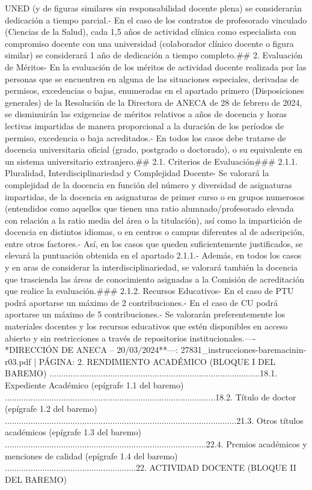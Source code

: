 \documentclass{article}
\begin{document}
\begin{itemize}
{{UNED (y de figuras similares sin responsabilidad docente plena) se considerarán dedicación a tiempo parcial.\n- En el caso de los contratos de profesorado vinculado (Ciencias de la Salud), cada 1,5 años de actividad clínica como especialista con compromiso docente con una universidad (colaborador clínico docente o figura similar) se considerará 1 año de dedicación a tiempo completo.\n\n## 2. Evaluación de Méritos\n\n- En la evaluación de los méritos de actividad docente realizada por las personas que se encuentren en alguna de las situaciones especiales, derivadas de permisos, excedencias o bajas, enumeradas en el apartado primero (Disposiciones generales) de la Resolución de la Directora de ANECA de 28 de febrero de 2024, se disminuirán las exigencias de méritos relativos a años de docencia y horas lectivas impartidas de manera proporcional a la duración de los períodos de permiso, excedencia o baja acreditados.\n- En todos los casos debe tratarse de docencia universitaria oficial (grado, postgrado o doctorado), o su equivalente en un sistema universitario extranjero.\n\n## 2.1. Criterios de Evaluación\n\n### 2.1.1. Pluralidad, Interdisciplinariedad y Complejidad Docente\n\n- Se valorará la complejidad de la docencia en función del número y diversidad de asignaturas impartidas, de la docencia en asignaturas de primer curso o en grupos numerosos (entendidos como aquellos que tienen una ratio alumnado/profesorado elevada con relación a la ratio media del área o la titulación), así como la impartición de docencia en distintos idiomas, o en centros o campus diferentes al de adscripción, entre otros factores.\n- Así, en los casos que queden suficientemente justificados, se elevará la puntuación obtenida en el apartado 2.1.1.\n- Además, en todos los casos y en aras de considerar la interdisciplinariedad, se valorará también la docencia que trascienda las áreas de conocimiento asignadas a la Comisión de acreditación que realice la evaluación.\n\n### 2.1.2. Recursos Educativos\n\n- En el caso de PTU podrá aportarse un máximo de 2 contribuciones.\n- En el caso de CU podrá aportarse un máximo de 5 contribuciones.\n- Se valorarán preferentemente los materiales docentes y los recursos educativos que estén disponibles en acceso abierto y sin restricciones a través de repositorios institucionales.\n\n----\n\n**DIRECCIÓN DE ANECA – 20/03/2024**\n\n---\n\nFUENTE: 27831_instrucciones-baremacinin-r03.pdf | PÁGINA: 2. RENDIMIENTO ACADÉMICO (BLOQUE I DEL BAREMO) ..........................................................................................18.1. Expediente Académico (epígrafe 1.1 del baremo) ..........................................................................................18.2. Título de doctor (epígrafe 1.2 del baremo) ...................................................................................................21.3. Otros títulos académicos (epígrafe 1.3 del baremo) ......................................................................................22.4. Premios académicos y menciones de calidad (epígrafe 1.4 del baremo) ........................................................22. ACTIVIDAD DOCENTE (BLOQUE II DEL BAREMO) }}
\end{itemize}
\end{document}
